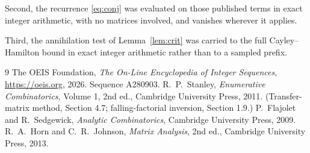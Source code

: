 \documentclass[11pt,a4paper]{article}
\theoremstyle{plain}
\theoremstyle{definition}
\begin{document}
Second, the recurrence \eqref{eq:conj} was evaluated on those published terms in exact
integer arithmetic, with no matrices involved, and vanishes wherever it applies.

Third, the annihilation test of Lemma~\ref{lem:crit} was carried to the full
Cayley--Hamilton bound in exact integer arithmetic rather than to a sampled prefix.

\begin{thebibliography}{9}
 The OEIS Foundation, \emph{The On-Line Encyclopedia of Integer
Sequences}, \url{https://oeis.org}, 2026. Sequence A280903.
 R.~P.~Stanley, \emph{Enumerative Combinatorics}, Volume 1, 2nd ed.,
Cambridge University Press, 2011. (Transfer-matrix method, Section 4.7; falling-factorial
inversion, Section 1.9.)
 P.~Flajolet and R.~Sedgewick, \emph{Analytic Combinatorics}, Cambridge
University Press, 2009.
 R.~A.~Horn and C.~R.~Johnson, \emph{Matrix Analysis}, 2nd ed., Cambridge
University Press, 2013.
\end{thebibliography}
\end{document}
